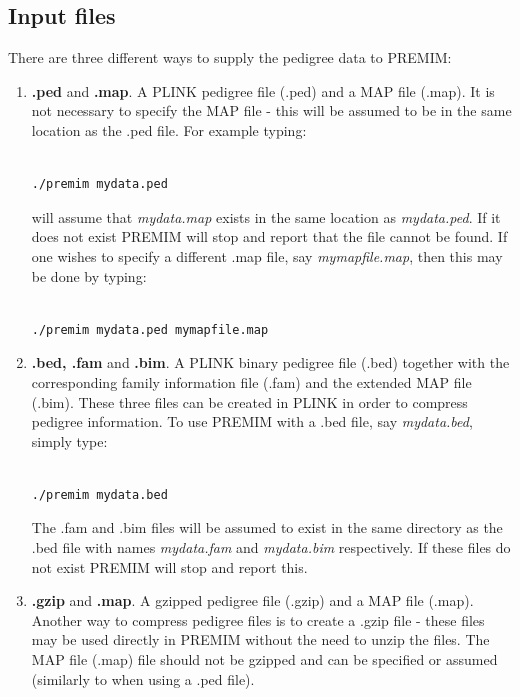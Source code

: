 \documentclass[a4paper,12pt]{article}
\begin{document}



\subsection{Input files}
\label{premim-input}

There are three different ways to supply the pedigree data to PREMIM: 
\begin{enumerate}

\item {\bf .ped} and {\bf .map}. A PLINK pedigree file (.ped) and a MAP file (.map). It is not necessary to specify the MAP file - this will be assumed to be in the same location as the .ped file. For example typing: \vspace{0.35cm} \begin{lstlisting}

./premim mydata.ped

\end{lstlisting} \vspace{0.35cm}will assume that {\it mydata.map} exists in the same location as {\it mydata.ped}. If it does not exist PREMIM will stop and report that the file cannot be found. If one wishes to specify a different .map file, say {\it mymapfile.map}, then this may be done by typing: \vspace{0.35cm} \begin{lstlisting}

./premim mydata.ped mymapfile.map

\end{lstlisting} \vspace{0.35cm}
\item {\bf .bed, .fam} and {\bf .bim}. A PLINK binary pedigree file (.bed) together with the corresponding family information file (.fam) and the extended MAP file (.bim). These three files can be created in PLINK in order to compress pedigree information. To use PREMIM with a .bed file, say {\it mydata.bed}, simply type: \vspace{0.35cm} \begin{lstlisting}

./premim mydata.bed

\end{lstlisting} \vspace{0.35cm}The .fam and .bim files will be assumed to exist in the same directory as the .bed file with names {\it mydata.fam} and {\it mydata.bim} respectively. If these files do not exist PREMIM will stop and report this. 
\item {\bf .gzip} and {\bf .map}. A gzipped pedigree file (.gzip) and a MAP file (.map). Another way to compress pedigree files is to create a .gzip file - these files may be used directly in PREMIM without the need to unzip the files. The MAP file (.map) file should not be gzipped and can be specified or assumed (similarly to when using a .ped file).\end{enumerate}
\end{document}
